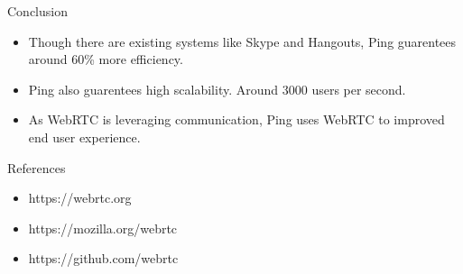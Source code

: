 \documentclass[final]{beamer}
\newlength{\onecolwid}
\begin{document}
\begin{frame}[t]
\begin{columns}[t]
\begin{column}{\onecolwid}

\begin{block}{Conclusion}

\begin{itemize}
\item Though there are existing systems like Skype and Hangouts, Ping guarentees around 60\% more efficiency.
\item Ping also guarentees high scalability. Around 3000 users per second.
\item As WebRTC is leveraging communication, Ping uses WebRTC to improved end user experience.
\end{itemize}

\end{block}





\begin{block}{References}

\begin{itemize}
\item https://webrtc.org
\item https://mozilla.org/webrtc
\item https://github.com/webrtc
\end{itemize}

\end{block}







\end{column}
\end{columns}
\end{frame}
\end{document}
